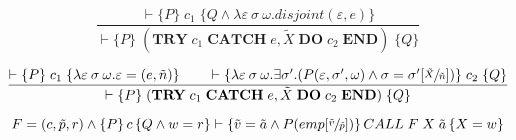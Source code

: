 \begin{equation}
\frac{\vdash \{P\} \; c_1 \; \{Q \wedge \lambda \varepsilon\:\sigma\:\omega. disjoint(\varepsilon, e)\}}{\vdash \{P\} \; (\textbf{TRY}\; c_1\; \textbf{CATCH}\; e, \tilde{X}\; \textbf{DO}\; c_2\; \textbf{END}) \; \{Q\}}
\end{equation}

\begin{equation}
\frac{\vdash \{P\} \; c_1 \; \{\lambda \varepsilon\:\sigma\:\omega. \varepsilon = (e, \tilde{n})\} \qquad \vdash \{\lambda \varepsilon\:\sigma\:\omega. \exists \sigma'. (P(\varepsilon, \sigma', \omega) \wedge \sigma = \sigma'[\sfrac{\tilde{X}}{\tilde{n}}])\} \; c_2 \; \{Q\}}{\vdash \{P\} \; (\textbf{TRY}\; c_1\; \textbf{CATCH}\; e, \tilde{X}\; \textbf{DO}\; c_2\; \textbf{END}) \; \{Q\}}
\end{equation}

\begin{equation}
F = (c,\tilde{p},r) \wedge \left\{P\right\} c \left\{Q \wedge w = r\right\} \vdash \left\{\tilde{v} = \tilde{a} \wedge P(emp[\sfrac{\tilde{v}}{\tilde{p}}])\right\}CALL \; F \; X \; \tilde{a} \left\{X = w\right\}
\end{equation}